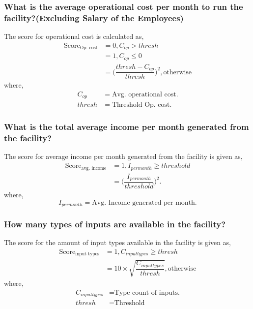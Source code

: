 \documentclass[oneside,twocolumn]{article}
\newcommand{\tsub}[2]{\text{#1}_{\text{#2}}}
\begin{document}
               \subsubsection{What is the average operational cost per month to run the facility?(Excluding Salary of the Employees)}
               The score for operational cost is calculated as,
               \begin{align*}
                 \tsub{Score}{Op. cost} &= 0, C_{op} > thresh \\
                 &= 1, C_{op} \le 0 \\
                 &= \Big(\dfrac{thresh - C_{op}}{thresh}\Big)^2, \text{otherwise}
               \end{align*}
               where,
               \begin{align*}
                 C_{op} &= \text{Avg. operational cost}. \\
                 thresh &= \text{Threshold Op. cost}.
               \end{align*}

               \subsubsection{What is the total average income per month generated from the facility?}
               The score for average income per month generated from the facility is given
               as,
               \begin{align*}
                 \tsub{Score}{avg. income} &= 1, I_{per month} \ge threshold \\
                 &= \Big(\dfrac{I_{per month}}{threshold}\Big)^{2}.
               \end{align*}
               where,
               \[
               I_{per month} = \text{Avg. Income generated per month.}
               \]
               \subsubsection{How many types of inputs are available in the facility?}
               The score for the amount of input types available in the facility is
               given as,
               \begin{align*}
                 \tsub{Score}{input types} &= 1, C_{input types} \ge thresh \\
                 &= 10 \times \sqrt{\dfrac{C_{input types}}{thresh}}, \text{otherwise}
               \end{align*}
               where,
               \begin{align*}
                 C_{input types} &= \text{Type count of inputs.} \\
                 thresh &= \text{Threshold}
               \end{align*}
\end{document}
